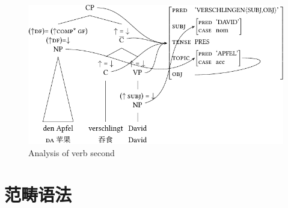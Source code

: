 \begin{enumerate}
\begin{figure}
\centerline{%
\includegraphics{Figures/den-apfel-verschlingt-david-lfg-lsp-crop}
}
\caption{\label{Abbildung-V2-LFG}Analysis of verb second}
\end{figure}%
\end{enumerate}

\pagebreak
\section{范畴语法}

